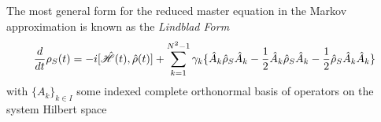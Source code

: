 The most general form\autocite[119--122]{Breuer2002} for the reduced master equation in the Markov approximation is known as the \emph{Lindblad Form}
\begin{equation}
	\frac{d}{dt} \rho_S (t) = -i[\hat{\mathscr{H}} (t), \hat{\rho} (t)] + \sum_{k=1}^{N^2-1} \gamma_k \{ \hat{A}_k \hat{\rho}_S \hat{A}_k -\frac{1}{2}  \hat{A}_k \hat{\rho}_S \hat{A}_k -\frac{1}{2} \hat{\rho}_S \hat{A}_k \hat{A}_k \}
\end{equation} 
with $\{A_k\}_{k \in I}$ some indexed complete orthonormal basis of operators on the system Hilbert space